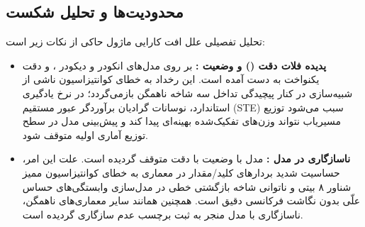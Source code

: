 \subsection{محدودیت‌ها و تحلیل شکست}
تحلیل تفصیلی علل افت کارایی ماژول حاکی از نکات زیر است:
\begin{itemize}
    \item \textbf{پدیده فلات دقت () و وضعیت :} بر روی مدل‌های انکودر و دیکودر ،  و  دقت یکنواخت  به دست آمده است. این رخداد به خطای کوانتیزاسیون ناشی از شبیه‌سازی  در کنار پیچیدگی تداخل سه شاخه ناهمگن بازمی‌گردد؛ در نرخ یادگیری استاندارد، نوسانات گرادیان برآوردگر عبور مستقیم (STE) سبب می‌شود توزیع مسیریاب نتواند وزن‌های تفکیک‌شده بهینه‌ای پیدا کند و پیش‌بینی مدل در سطح توزیع آماری اولیه متوقف شود.
    \item \textbf{ناسازگاری در مدل :} مدل  با وضعیت  با دقت  متوقف گردیده است. علت این امر، حساسیت شدید بردارهای کلید/مقدار در معماری  به خطای کوانتیزاسیون ممیز شناور ۸ بیتی و ناتوانی شاخه بازگشتی خطی در مدل‌سازی وابستگی‌های حساس علّی بدون نگاشت فرکانسی دقیق است. همچنین همانند سایر معماری‌های ناهمگن، ناسازگاری با مدل  منجر به ثبت برچسب عدم سازگاری گردیده است.
\end{itemize}

